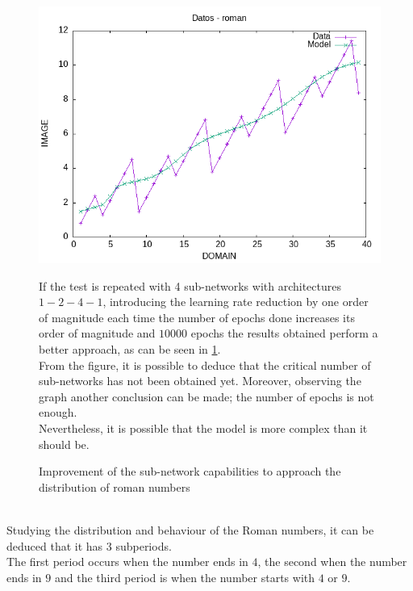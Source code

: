\documentclass[a4paper, 11pt]{article}
\begin{document}
\begin{figure}[h]
    \begin{minipage}{5.5cm}
        \begin{center}
            \includegraphics[width = 1 \linewidth]{img/roman/roman_third_approach.png}
            \caption{Improvement of the sub-network capabilities to approach the distribution of roman numbers}
            \label{second-approach}
        \end{center}
    \end{minipage} \hspace{1em}
    \begin{minipage}{9cm}
 If the test is repeated with 4 sub-networks with architectures $1-2-4-1$, introducing the learning rate reduction by one order of magnitude each time the number of epochs done increases its order of magnitude and $10000$ epochs the results obtained perform a better approach, as can be seen in \ref{second-approach}.\\
 From the figure, it is possible to deduce that the critical number of sub-networks has not been obtained yet. Moreover, observing the graph another conclusion can be made; the number of epochs is not enough.\\
 Nevertheless, it is possible that the model is more complex than it should be.
    \end{minipage}
\end{figure}\\
Studying the distribution and behaviour of the Roman numbers, it can be deduced that it has 3 subperiods.\\
The first period occurs when the number ends in $4$, the second when the number ends in $9$ and the third period is when the number starts with $4$ or $9$.\\
\end{document}
